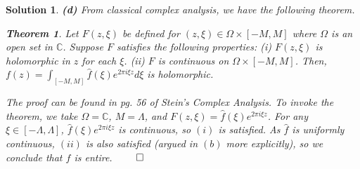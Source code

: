 \documentclass{article} %
\theoremstyle{quest}
\newtheorem*{theorem}{Theorem}
\newtheorem*{solution}{Solution}
\begin{document}
\begin{solution}
\bigskip

\textbf{(d)} From classical complex analysis, we have the following theorem.

\begin{theorem}
Let $F(z,\xi)$ be defined for $(z,\xi) \in \Omega \times [-M,M]$ where $\Omega$ is an
open set in $\mathbb{C}$. Suppose $F$ satisfies the following properties: (i) 
$F(z,\xi)$ is holomorphic in $z$ for each $\xi$. (ii) $F$ is continuous on $\Omega \times [-M,M]$. 
Then, $f(z) = \int_{[-M,M]} \hat{f}(\xi) e^{2\pi i \xi z} d\xi$ is holomorphic.  
\end{theorem} 

The proof can be found in pg. 56 of Stein's Complex Analysis. To invoke the theorem, 
we take $\Omega = \mathbb{C}$,
$M = \Lambda$, and $F(z,\xi) = \hat{f}(\xi)e^{2\pi i \xi z}$. For any $\xi \in [-\Lambda, \Lambda]$,
$\hat{f}(\xi)e^{2\pi i \xi z}$ is continuous, so $(i)$ is satisfied. As $\hat{f}$ is uniformly continuous,
$(ii)$ is also satisfied (argued in $(b)$ more explicitly), so we conclude that $f$ is entire. 
\hfill $\qed$

\end{solution}

\bigskip
\end{document}
